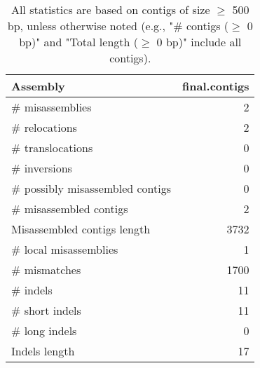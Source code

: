 \documentclass[12pt,a4paper]{article}
\begin{document}
\begin{table}[ht]
\begin{center}
\caption{All statistics are based on contigs of size $\geq$ 500 bp, unless otherwise noted (e.g., "\# contigs ($\geq$ 0 bp)" and "Total length ($\geq$ 0 bp)" include all contigs).}
\begin{tabular}{|l*{1}{|r}|}
\hline
Assembly & final.contigs \\ \hline
\# misassemblies & 2 \\ \hline
\hspace{5mm}\# relocations & 2 \\ \hline
\hspace{5mm}\# translocations & 0 \\ \hline
\hspace{5mm}\# inversions & 0 \\ \hline
\# possibly misassembled contigs & 0 \\ \hline
\# misassembled contigs & 2 \\ \hline
Misassembled contigs length & 3732 \\ \hline
\# local misassemblies & 1 \\ \hline
\# mismatches & 1700 \\ \hline
\# indels & 11 \\ \hline
\hspace{5mm}\# short indels & 11 \\ \hline
\hspace{5mm}\# long indels & 0 \\ \hline
Indels length & 17 \\ \hline
\end{tabular}
\end{center}
\end{table}
\end{document}
